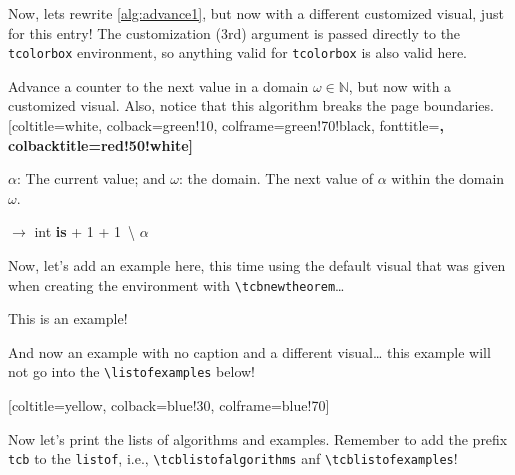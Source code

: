 \documentclass{article}
\begin{document}
Now, lets rewrite \autoref{alg:advance1}, but now with a different customized visual, just for this entry!  The customization (3rd) argument is passed directly to the \texttt{tcolorbox} environment, so anything valid for \texttt{tcolorbox} is also valid here.

\begin{tcbalgorithm}{Advance a counter to the next value in a domain $\omega \in \mathbb{N}$, but now with a customized visual. Also, notice that this algorithm breaks the page boundaries.}[coltitle=white, colback=green!10, colframe=green!70!black, fonttitle=\sffamily\bfseries\large, colbacktitle=red!50!white]
  \label{alg:advance2}
\begin{algorithmic}[1]
  \Statex \Input $\alpha$: The current value; and $\omega$: the domain.
  \Statex \Output The next value of $\alpha$ within the domain $\omega$.

  \Vspace

   $\rightarrow$ int \textbf{is}
    \Let {\alpha} {\alpha + 1}
    \While{$\alpha \not\in \omega \And \omega \neq \bracesemptyset$}
      \Let {\alpha} {\alpha + 1}
    \EndWhile
    \If{$\omega \neq \bracesemptyset$}
      \Let {\omega} {\omega \,\backslash \lbrace \alpha \rbrace}
    \EndIf
    \State \Return $\alpha$
  \EndFunction
\end{algorithmic}
\end{tcbalgorithm}

Now, let's add an example here, this time using the default visual that was given when creating the environment with \verb!\tcbnewtheorem!…

\begin{tcbexample}{This is an example!}
  \emph{\kant[3]}
\end{tcbexample}

And now an example with no caption and a different visual…  this example will not go into the \verb!\listofexamples! below!

\begin{tcbexample}{}[coltitle=yellow, colback=blue!30, colframe=blue!70]
  \emph{\kant[4]}
\end{tcbexample}

Now let's print the lists of algorithms and examples. Remember to add the prefix \texttt{tcb} to the \texttt{listof}, i.e., \verb!\tcblistofalgorithms! anf \verb!\tcblistofexamples!!

\tcblistofalgorithms

\tcblistofexamples
\end{document}
